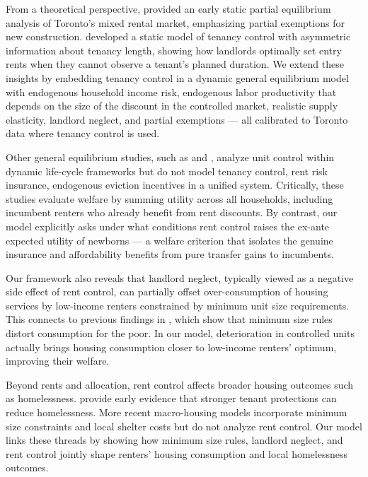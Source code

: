 \documentclass[parskip=full]{article}
\begin{document}
From a theoretical perspective, \citet{fallis-1985} provided an early static partial equilibrium analysis of Toronto’s mixed rental market, emphasizing partial exemptions for new construction. \citet{be-2000} developed a static model of tenancy control with asymmetric information about tenancy length, showing how landlords optimally set entry rents when they cannot observe a tenant’s planned duration. We extend these insights by embedding tenancy control in a dynamic general equilibrium model with endogenous household income risk, endogenous labor productivity that depends on the size of the discount in the controlled market, realistic supply elasticity, landlord neglect, and partial exemptions — all calibrated to Toronto data where tenancy control is used.

Other general equilibrium studies, such as \citet{eric-1995} and \citet{fmn-2023}, analyze unit control within dynamic life-cycle frameworks but do not model tenancy control, rent risk insurance, endogenous eviction incentives in a unified system. Critically, these studies evaluate welfare by summing utility across all households, including incumbent renters who already benefit from rent discounts. By contrast, our model explicitly asks under what conditions rent control raises the ex-ante expected utility of newborns — a welfare criterion that isolates the genuine insurance and affordability benefits from pure transfer gains to incumbents.

Our framework also reveals that landlord neglect, typically viewed as a negative side effect of rent control, can partially offset over-consumption of housing services by low-income renters constrained by minimum unit size requirements. This connects to previous findings in \citet{rs-2023}, which show that minimum size rules distort consumption for the poor. In our model, deterioration in controlled units actually brings housing consumption closer to low-income renters’ optimum, improving their welfare.

Beyond rents and allocation, rent control affects broader housing outcomes such as homelessness. \citet{eo-1998} provide early evidence that stronger tenant protections can reduce homelessness. More recent macro-housing models \citep{az-2024, abramson-2024} incorporate minimum size constraints and local shelter costs but do not analyze rent control. Our model links these threads by showing how minimum size rules, landlord neglect, and rent control jointly shape renters’ housing consumption and local homelessness outcomes.
\end{document}
